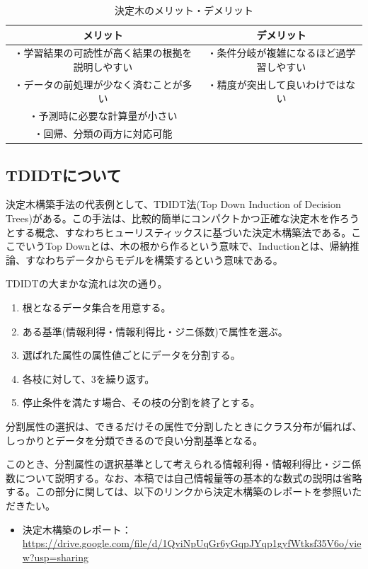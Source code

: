 \documentclass[dvipdfmx]{jsarticle}
\begin{document}
\begin{table}[H]
  \begin{center}
    \caption{決定木のメリット・デメリット}
    \begin{tabular}{|c|c|} \hline
      メリット & デメリット \\ \hline
      ・学習結果の可読性が高く結果の根拠を説明しやすい & ・条件分岐が複雑になるほど過学習しやすい\\
      ・データの前処理が少なく済むことが多い & ・精度が突出して良いわけではない\\
      ・予測時に必要な計算量が小さい & \\
      ・回帰、分類の両方に対応可能 &　\\ \hline
    \end{tabular}
    \label{hyo01}
  \end{center}
\end{table}
\subsection{TDIDTについて}
決定木構築手法の代表例として、TDIDT法(Top Down Induction of Decision Trees)がある。この手法は、比較的簡単にコンパクトかつ正確な決定木を作ろうとする概念、すなわちヒューリスティックスに基づいた決定木構築法である。ここでいうTop Downとは、木の根から作るという意味で、Inductionとは、帰納推論、すなわちデータからモデルを構築するという意味である。\par
TDIDTの大まかな流れは次の通り。
\begin{enumerate}
  \item 根となるデータ集合を用意する。
  \item ある基準(情報利得・情報利得比・ジニ係数)で属性を選ぶ。
  \item 選ばれた属性の属性値ごとにデータを分割する。
  \item 各枝に対して、3を繰り返す。
  \item 停止条件を満たす場合、その枝の分割を終了とする。
\end{enumerate}
分割属性の選択は、できるだけその属性で分割したときにクラス分布が偏れば、しっかりとデータを分類できるので良い分割基準となる。\par
このとき、分割属性の選択基準として考えられる情報利得・情報利得比・ジニ係数について説明する。なお、本稿では自己情報量等の基本的な数式の説明は省略する。この部分に関しては、以下のリンクから決定木構築のレポートを参照いただきたい。
\begin{itemize}
  \item 決定木構築のレポート：\url{https://drive.google.com/file/d/1QviNpUqGr6yGqpJYqp1gyfWtksf35V6o/view?usp=sharing}
\end{itemize}
\end{document}
